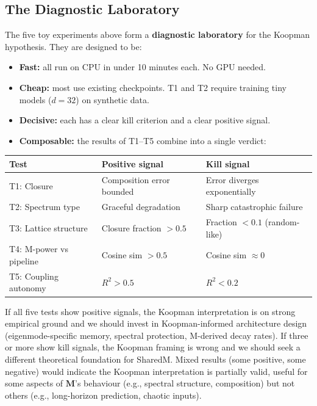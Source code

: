 \documentclass[11pt, a4paper]{article}
\newcommand{\M}{\mathbf{M}}
\theoremstyle{plain}
\theoremstyle{remark}
\begin{document}
\subsection{The Diagnostic Laboratory}

The five toy experiments above form a \textbf{diagnostic laboratory} for the Koopman hypothesis.
They are designed to be:
\begin{itemize}[nosep]
    \item \textbf{Fast:} all run on CPU in under 10 minutes each. No GPU needed.
    \item \textbf{Cheap:} most use existing checkpoints. T1 and T2 require training tiny models ($d{=}32$) on synthetic data.
    \item \textbf{Decisive:} each has a clear kill criterion and a clear positive signal.
    \item \textbf{Composable:} the results of T1--T5 combine into a single verdict:
\end{itemize}

\begin{center}\small
\begin{tabular}{@{}lll@{}}
\toprule
\textbf{Test} & \textbf{Positive signal} & \textbf{Kill signal} \\
\midrule
T1: Closure & Composition error bounded & Error diverges exponentially \\
T2: Spectrum type & Graceful degradation & Sharp catastrophic failure \\
T3: Lattice structure & Closure fraction $> 0.5$ & Fraction $< 0.1$ (random-like) \\
T4: M-power vs pipeline & Cosine sim $> 0.5$ & Cosine sim $\approx 0$ \\
T5: Coupling autonomy & $R^2 > 0.5$ & $R^2 < 0.2$ \\
\bottomrule
\end{tabular}
\end{center}

\noindent If all five tests show positive signals, the Koopman interpretation is on strong empirical ground and we should invest in Koopman-informed architecture design (eigenmode-specific memory, spectral protection, M-derived decay rates).
If three or more show kill signals, the Koopman framing is wrong and we should seek a different theoretical foundation for SharedM.
Mixed results (some positive, some negative) would indicate the Koopman interpretation is partially valid, useful for some aspects of $\M$'s behaviour (e.g., spectral structure, composition) but not others (e.g., long-horizon prediction, chaotic inputs).
\end{document}
